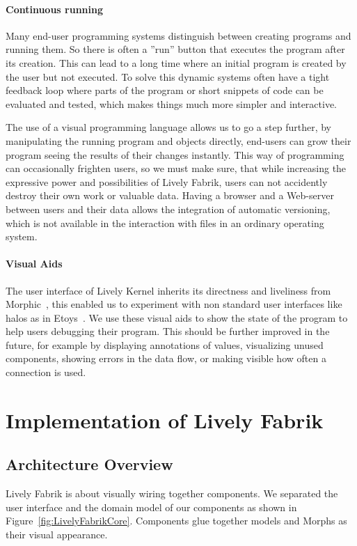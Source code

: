 \documentclass[pdftex, times, 10pt, twocolumn]{article}
\begin{document}
\paragraph{Continuous running}
Many end-user programming systems distinguish between creating programs and running them. So there is often a ''run'' button that executes the program after its creation. This can lead to a long time where an initial program is created by the user but not executed. To solve this dynamic systems often have a tight feedback loop where parts of the program or short snippets of code can be evaluated and tested, which makes things much more simpler and interactive. 

The use of a visual programming language allows us to go a step further, by manipulating the running program and objects directly, end-users can grow their program seeing the results of their changes instantly. This way of programming can occasionally frighten users, so we must make sure, that while increasing the expressive power and possibilities of Lively Fabrik, users can not accidently destroy their own work or valuable data. Having a browser and a Web-server between users and their data allows the integration of automatic versioning, which is not available in the interaction with files in an ordinary operating system.  



\paragraph{Visual Aids}
The user interface of Lively Kernel inherits its directness and liveliness from Morphic~\cite{Maloney1995DLM}, this enabled us to experiment with non standard user interfaces like halos as in Etoys~\cite{Kay2005SEA}. We use these  visual aids to show the state of the program to help users debugging their program. This should be further improved in the future, for example by displaying annotations of values, visualizing unused components, showing errors in the data flow, or making visible how often a connection is used. 



\section{Implementation of Lively Fabrik}


\subsection{Architecture Overview}
Lively Fabrik is about visually wiring together components. We separated the user interface and the domain model of our components as shown in Figure~\ref{fig:LivelyFabrikCore}. Components glue together models and Morphs as their visual appearance.  
\end{document}

